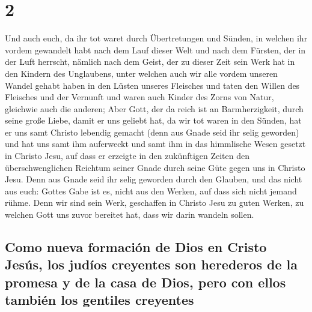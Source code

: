 \hypertarget{section-1}{%
\section{2}\label{section-1}}

 Und auch euch, da ihr tot waret durch Übertretungen und
Sünden,  in welchen ihr vordem gewandelt habt nach dem
Lauf dieser Welt und nach dem Fürsten, der in der Luft herrscht, nämlich
nach dem Geist, der zu dieser Zeit sein Werk hat in den Kindern des
Unglaubens,  unter welchen auch wir alle vordem unseren
Wandel gehabt haben in den Lüsten unseres Fleisches und taten den Willen
des Fleisches und der Vernunft und waren auch Kinder des Zorns von
Natur, gleichwie auch die anderen;  Aber Gott, der da
reich ist an Barmherzigkeit, durch seine große Liebe, damit er uns
geliebt hat,  da wir tot waren in den Sünden, hat er uns
samt Christo lebendig gemacht (denn aus Gnade seid ihr selig geworden)
 und hat uns samt ihm auferweckt und samt ihm in das
himmlische Wesen gesetzt in Christo Jesu,  auf dass er
erzeigte in den zukünftigen Zeiten den überschwenglichen Reichtum seiner
Gnade durch seine Güte gegen uns in Christo Jesu.  Denn
aus Gnade seid ihr selig geworden durch den Glauben, und das nicht aus
euch: Gottes Gabe ist es,  nicht aus den Werken, auf dass
sich nicht jemand rühme.  Denn wir sind sein Werk,
geschaffen in Christo Jesu zu guten Werken, zu welchen Gott uns zuvor
bereitet hat, dass wir darin wandeln sollen.

\hypertarget{como-nueva-formaciuxf3n-de-dios-en-cristo-jesuxfas-los-juduxedos-creyentes-son-herederos-de-la-promesa-y-de-la-casa-de-dios-pero-con-ellos-tambiuxe9n-los-gentiles-creyentes}{%
\subsection{Como nueva formación de Dios en Cristo Jesús, los judíos
creyentes son herederos de la promesa y de la casa de Dios, pero con
ellos también los gentiles
creyentes}\label{como-nueva-formaciuxf3n-de-dios-en-cristo-jesuxfas-los-juduxedos-creyentes-son-herederos-de-la-promesa-y-de-la-casa-de-dios-pero-con-ellos-tambiuxe9n-los-gentiles-creyentes}}

